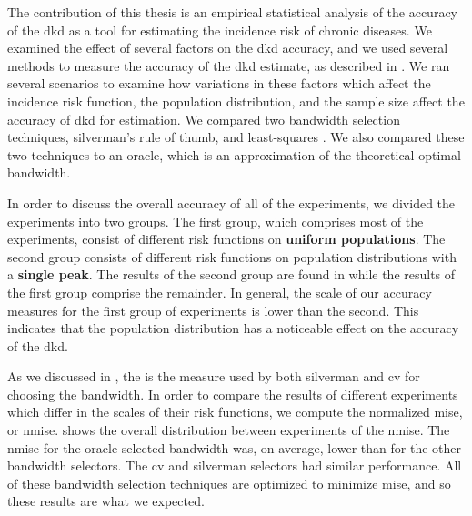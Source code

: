 

The contribution of this thesis is an empirical statistical analysis of the accuracy of the \gls{dkd}
as a tool for estimating the incidence risk of chronic diseases.
We examined the effect of several factors on the \gls{dkd} accuracy,
and we used several methods to measure the accuracy of the \gls{dkd} estimate,
as described in .
We ran several scenarios to examine how variations in these factors which affect the incidence risk function,
the population distribution, and the sample size affect the accuracy of \gls{dkd} for estimation.
We compared two bandwidth selection techniques, \gls{silverman}'s rule of thumb,
and least-squares .
We also compared these two techniques to an \gls{oracle},
which is an approximation of the theoretical optimal bandwidth.

In order to discuss the overall accuracy of all of the experiments,
we divided the experiments into two groups.
The first group, which comprises most of the experiments,
consist of different \gls{risk} functions on \textbf{uniform populations}.
The second group consists of different \gls{risk} functions on population distributions with a \textbf{single peak}.
The results of the second group are found in  while the results of the first group comprise the remainder.
In general, the scale of our accuracy measures for the first group of experiments is lower than the second.
This indicates that the population distribution has a noticeable effect on the accuracy of the \gls{dkd}.

As we discussed in ,
the  is the measure used by both \gls{silverman} and \gls{cv} for choosing the bandwidth.
In order to compare the results of different experiments which differ in the scales of their \gls{risk} functions,
we compute the normalized \gls{mise}, or \gls{nmise}. 
 shows the overall distribution between experiments of the \gls{nmise}.
The \gls{nmise} for the \gls{oracle} selected bandwidth was, on average,
lower than for the other bandwidth selectors.
The \gls{cv} and \gls{silverman} selectors had similar performance.
All of these bandwidth selection techniques are optimized to minimize \gls{mise},
and so these results are what we expected.

